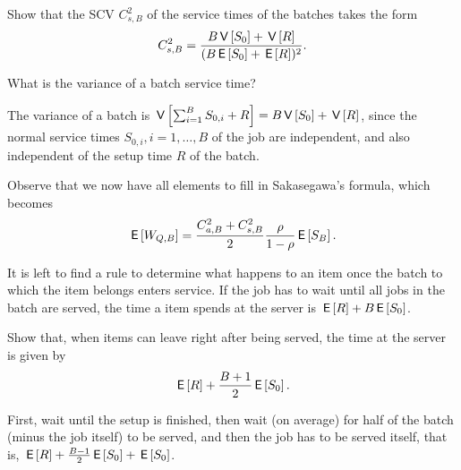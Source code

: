 \begin{exercise}
Show that the SCV $C_{s,B}^2$ of the service times of the batches takes the form
\begin{equation}\label{eq:84}
C_{s, B}^2 = \frac{B \,\mathsf{V}\left[S_0\right] + \,\mathsf{V}\left[R\right]}{(B \,\mathsf{E}\left[S_0\right] + \,\mathsf{E}\left[R\right])^2}.
\end{equation}
\begin{hint}
 What is the variance of a batch service time?
\end{hint}
\begin{solution}
 The variance of a batch is $\,\mathsf{V}\left[\sum_{i=1}^B S_{0,i} + R\right] = B\,\mathsf{V}\left[S_0\right] + \,\mathsf{V}\left[R\right]$, since the normal service times $S_{0,i}, i=1,\ldots, B$ of the job are independent, and also independent of the setup time $R$ of the batch.
\end{solution}
\end{exercise}

Observe that we now have all elements to fill in Sakasegawa's formula, which becomes
\begin{equation*}
  \,\mathsf{E}\left[W_{Q,B}\right] = \frac{C_{a,B}^2 + C_{s,B}^2}2 \frac \rho{1-\rho} \,\mathsf{E}\left[S_B\right].
\end{equation*}

It is left to find a rule to determine what happens to an item once the batch to which the item belongs enters service.
If the job has to wait until all jobs in the batch are served, the time a item spends at the server is $\,\mathsf{E}\left[R\right] + B \,\mathsf{E}\left[S_0\right]$.


\begin{exercise}
Show that, when items can leave right after being served, the time at the server is given by
\begin{equation}\label{eq:85}
\,\mathsf{E}\left[R\right] + \frac{B+1}{2}\,\mathsf{E}\left[S_0\right].
\end{equation}
\begin{solution}
 First, wait until the setup is finished, then wait (on average) for half of the batch (minus the job itself) to be served, and then the job has to be served itself, that is,
$\,\mathsf{E}\left[R\right] + \frac{B-1}{2}\,\mathsf{E}\left[S_0\right] +\,\mathsf{E}\left[S_0\right]$.
\end{solution}
\end{exercise}


